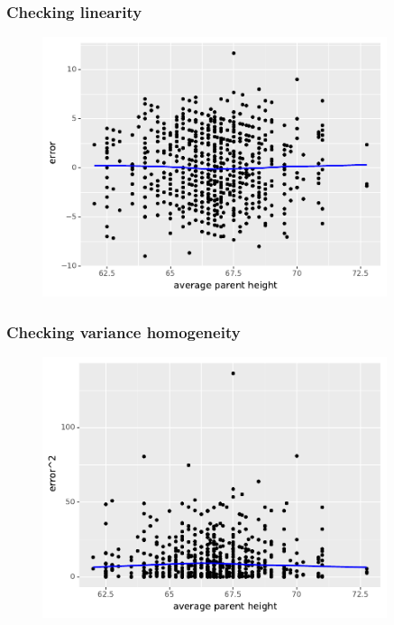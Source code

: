 \documentclass[handout]{beamer}
\begin{document}
\begin{frame}
	\frametitle{Checking linearity}
	
	\begin{figure}[ht]
		\centerline{\includegraphics[width=0.9\textwidth]{../figures/galton_linearity.pdf}}
	\end{figure}
	
\end{frame}

\begin{frame}
	\frametitle{Checking variance homogeneity}
	
	\begin{figure}[ht]
		\centerline{\includegraphics[width=0.9\textwidth]{../figures/galton_variance.pdf}}
	\end{figure}
	
\end{frame}
\end{document}
